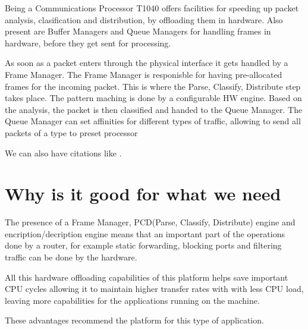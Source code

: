 Being a Communications Processor T1040 offers facilities for speeding up
packet analysis, clasification and distribution, by offloading 
them in hardware. Also present are Buffer Managers and Queue Managers 
for handling frames in hardware, before they get sent for processing.


As soon as a packet enters through the physical interface it gets handled 
by a Frame Manager. The Frame Manager is responisble for having pre-allocated
frames for the incoming packet. This is where the Parse, Classify, Distribute
step takes place. The pattern maching is done by a configurable HW engine.
Based on the analysis, the packet is then classified and handed to the
Queue Manager. The Queue Manager can set affinities for different types of
traffic, allowing to send all packets of a type to preset processor

We can also have citations like \cite{iso-odf}.

\section{Why is it good for what we need}

The presence of a Frame Manager, PCD(Parse, Classify, Distribute) engine
and encription/decription engine means that an important part of 
the operations done by a router, for example static forwarding, 
blocking ports and filtering traffic can be done by the hardware.

All this hardware offloading capabilities of this platform helps save 
important CPU cycles allowing it to maintain higher transfer rates with with
less CPU load, leaving more capabilities for the applications running on the
machine. 

These advantages recommend the platform for this type of application.
